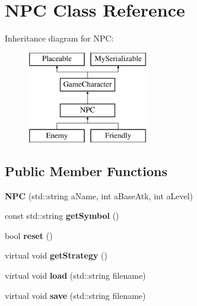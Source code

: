 \hypertarget{class_n_p_c}{}\section{N\+PC Class Reference}
\label{class_n_p_c}
Inheritance diagram for N\+PC\+:\begin{figure}[H]
\begin{center}
\leavevmode
\includegraphics[height=4.000000cm]{class_n_p_c}
\end{center}
\end{figure}
\subsection*{Public Member Functions}
\begin{DoxyCompactItemize}
\item 
\hypertarget{class_n_p_c_ae701662c099470aa99a4730c024b9f84}{}\label{class_n_p_c_ae701662c099470aa99a4730c024b9f84} 
{\bfseries N\+PC} (std\+::string a\+Name, int a\+Base\+Atk, int a\+Level)
\item 
\hypertarget{class_n_p_c_a3c15a5d8f02b5962aab11187b6ff5029}{}\label{class_n_p_c_a3c15a5d8f02b5962aab11187b6ff5029} 
const std\+::string {\bfseries get\+Symbol} ()
\item 
\hypertarget{class_n_p_c_a90707f8d4132352e3a79f1774df9a3aa}{}\label{class_n_p_c_a90707f8d4132352e3a79f1774df9a3aa} 
bool {\bfseries reset} ()
\item 
\hypertarget{class_n_p_c_afd87c014b5c0d6d4404e9b1fa0ab35fa}{}\label{class_n_p_c_afd87c014b5c0d6d4404e9b1fa0ab35fa} 
virtual void {\bfseries get\+Strategy} ()
\item 
\hypertarget{class_n_p_c_a09d4b4500a23e4919915ba60682f2d20}{}\label{class_n_p_c_a09d4b4500a23e4919915ba60682f2d20} 
virtual void {\bfseries load} (std\+::string filename)
\item 
\hypertarget{class_n_p_c_a2ac4ef18f0adffd50ec066347ed027a6}{}\label{class_n_p_c_a2ac4ef18f0adffd50ec066347ed027a6} 
virtual void {\bfseries save} (std\+::string filename)
\end{DoxyCompactItemize}
